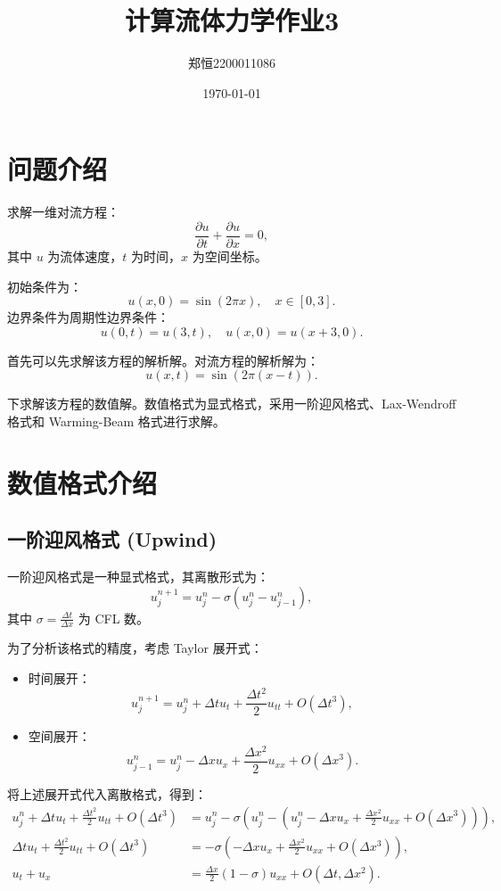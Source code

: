 \documentclass[12pt,a4paper]{article}
\title{计算流体力学作业3}
\author{郑恒2200011086}
\date{\today}
\begin{document}
\maketitle

\section{问题介绍}
求解一维对流方程：
\begin{equation}
    \frac{\partial u}{\partial t} + \frac{\partial u}{\partial x} = 0,
\end{equation}
其中 $u$ 为流体速度，$t$ 为时间，$x$ 为空间坐标。

初始条件为：
\begin{equation}
    u(x, 0) = \sin(2\pi x), \quad x \in [0,3].
\end{equation}
边界条件为周期性边界条件：
\begin{equation}
    u(0, t) = u(3, t), \quad u(x, 0) = u(x + 3, 0).
\end{equation}

首先可以先求解该方程的解析解。对流方程的解析解为：
\begin{equation}
    u(x, t) = \sin(2\pi (x - t)).
\end{equation}

下求解该方程的数值解。数值格式为显式格式，采用一阶迎风格式、Lax-Wendroff 格式和 Warming-Beam 格式进行求解。

\section{数值格式介绍}
\subsection{一阶迎风格式 (Upwind)}
一阶迎风格式是一种显式格式，其离散形式为：
\[
u_j^{n+1} = u_j^n - \sigma \left( u_j^n - u_{j-1}^n \right),
\]
其中 $\sigma = \frac{ \Delta t}{\Delta x}$ 为 CFL 数。

为了分析该格式的精度，考虑 Taylor 展开式：
\begin{itemize}
    \item 时间展开：
    \[
    u_j^{n+1} = u_j^n + \Delta t u_t + \frac{\Delta t^2}{2} u_{tt} + O(\Delta t^3),
    \]
    \item 空间展开：
    \[
    u_{j-1}^n = u_j^n - \Delta x u_x + \frac{\Delta x^2}{2} u_{xx} + O(\Delta x^3).
    \]
\end{itemize}

将上述展开式代入离散格式，得到：
\begin{align*}
u_j^n + \Delta t u_t + \frac{\Delta t^2}{2} u_{tt} + O(\Delta t^3) &= u_j^n - \sigma \left( u_j^n - \left( u_j^n - \Delta x u_x + \frac{\Delta x^2}{2} u_{xx} + O(\Delta x^3) \right) \right), \\
\Delta t u_t + \frac{\Delta t^2}{2} u_{tt} + O(\Delta t^3) &= -\sigma \left( -\Delta x u_x + \frac{\Delta x^2}{2} u_{xx} + O(\Delta x^3) \right), \\
u_t +  u_x &= \frac{\Delta x}{2} (1 - \sigma) u_{xx} + O(\Delta t, \Delta x^2).
\end{align*}
\end{document}
